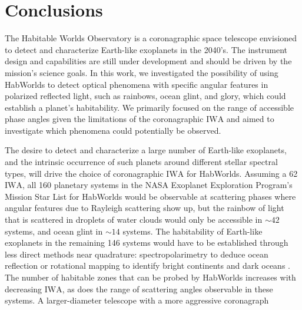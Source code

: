 \documentclass[usenatbib]{mnras}
\newcommand{\IWA}{\ensuremath{\mathrm{IWA}}\xspace}
\newcommand{\HWO}{HabWorlds\xspace}
\begin{document}
\section{Conclusions}
\label{sec:4}


The Habitable Worlds Observatory is a coronagraphic space telescope envisioned to detect and characterize Earth-like exoplanets in the 2040's. 
The instrument design and capabilities are still under development and should be driven by the mission's science goals.
In this work, we investigated the possibility of using \HWO to detect optical phenomena with specific angular features in polarized reflected light, such as rainbows, ocean glint, and glory, which could establish a planet's habitability. 
We primarily focused on the range of accessible phase angles given the limitations of the coronagraphic \IWA and aimed to investigate which phenomena could potentially be observed.

The desire to detect and characterize a large number of Earth-like exoplanets, and the intrinsic occurrence of such planets around different stellar spectral types, will drive the choice of coronagraphic \IWA for \HWO. 
Assuming a \qty{62}{\mas} \IWA, all \num{160} planetary systems in the NASA Exoplanet Exploration Program's Mission Star List for \HWO would be observable at scattering phases where angular features due to Rayleigh scattering show up, but the rainbow of light that is scattered in droplets of water clouds would only be accessible in $\sim\num{42}$ systems, and ocean glint in $\sim\num{14}$ systems.
The habitability of Earth-like exoplanets in the remaining 146 systems would have to be established through less direct methods near quadrature: spectropolarimetry to deduce ocean reflection \citep{trees2022} or rotational mapping to identify bright continents and dark oceans \citep[e.g.,][]{2009ApJ...700..915C,lustig2019}.   
The number of habitable zones that can be probed by \HWO increases with decreasing \IWA, as does the range of scattering angles observable in these systems. 
A larger-diameter telescope with a more aggressive coronagraph
\end{document}
